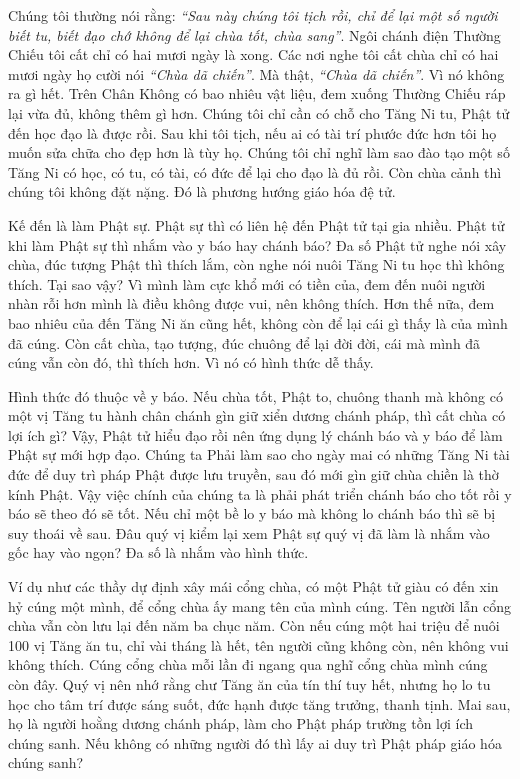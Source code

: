 \documentclass[
  12pt,
  oneside]{book}
\begin{document}
Chúng tôi thường nói rằng: \emph{``Sau này chúng tôi tịch rồi, chỉ để lại một số người biết tu, biết đạo chớ không để lại chùa tốt, chùa sang''}. Ngôi chánh điện Thường Chiếu tôi cất chỉ có hai mươi ngày là xong. Các nơi nghe tôi cất chùa chỉ có hai mươi ngày họ cười nói \emph{``Chùa dã chiến''}. Mà thật, \emph{``Chùa dã chiến''}. Vì nó không ra gì hết. Trên Chân Không có bao nhiêu vật liệu, đem xuống Thường Chiếu ráp lại vừa đủ, không thêm gì hơn. Chúng tôi chỉ cần có chỗ cho Tăng Ni tu, Phật tử đến học đạo là được rồi. Sau khi tôi tịch, nếu ai có tài trí phước đức hơn tôi họ muốn sửa chữa cho đẹp hơn là tùy họ. Chúng tôi chỉ nghĩ làm sao đào tạo một số Tăng Ni có học, có tu, có tài, có đức để lại cho đạo là đủ rồi. Còn chùa cảnh thì chúng tôi không đặt nặng. Đó là phương hướng giáo hóa đệ tử.

Kế đến là làm Phật sự. Phật sự thì có liên hệ đến Phật tử tại gia nhiều. Phật tử khi làm Phật sự thì nhắm vào y báo hay chánh báo? Đa số Phật tử nghe nói xây chùa, đúc tượng Phật thì thích lắm, còn nghe nói nuôi Tăng Ni tu học thì không thích. Tại sao vậy? Vì mình làm cực khổ mới có tiền của, đem đến nuôi người nhàn rỗi hơn mình là điều không được vui, nên không thích. Hơn thế nữa, đem bao nhiêu của đến Tăng Ni ăn cũng hết, không còn để lại cái gì thấy là của mình đã cúng. Còn cất chùa, tạo tượng, đúc chuông để lại đời đời, cái mà mình đã cúng vẫn còn đó, thì thích hơn. Vì nó có hình thức dễ thấy.

Hình thức đó thuộc về y báo. Nếu chùa tốt, Phật to, chuông thanh mà không có một vị Tăng tu hành chân chánh gìn giữ xiển dương chánh pháp, thì cất chùa có lợi ích gì? Vậy, Phật tử hiểu đạo rồi nên ứng dụng lý chánh báo và y báo để làm Phật sự mới hợp đạo. Chúng ta Phải làm sao cho ngày mai có những Tăng Ni tài đức để duy trì pháp Phật được lưu truyền, sau đó mới gìn giữ chùa chiền là thờ kính Phật. Vậy việc chính của chúng ta là phải phát triển chánh báo cho tốt rồi y báo sẽ theo đó sẽ tốt. Nếu chỉ một bề lo y báo mà không lo chánh báo thì sẽ bị suy thoái về sau. Đâu quý vị kiểm lại xem Phật sự quý vị đã làm là nhắm vào gốc hay vào ngọn? Đa số là nhắm vào hình thức.

Ví dụ như các thầy dự định xây mái cổng chùa, có một Phật tử giàu có đến xin hỷ cúng một mình, để cổng chùa ấy mang tên của mình cúng. Tên người lẫn cổng chùa vẫn còn lưu lại đến năm ba chục năm. Còn nếu cúng một hai triệu để nuôi 100 vị Tăng ăn tu, chỉ vài tháng là hết, tên người cũng không còn, nên không vui không thích. Cúng cổng chùa mỗi lần đi ngang qua nghĩ cổng chùa mình cúng còn đây. Quý vị nên nhớ rằng chư Tăng ăn của tín thí tuy hết, nhưng họ lo tu học cho tâm trí được sáng suốt, đức hạnh được tăng trưởng, thanh tịnh. Mai sau, họ là người hoằng dương chánh pháp, làm cho Phật pháp trường tồn lợi ích chúng sanh. Nếu không có những người đó thì lấy ai duy trì Phật pháp giáo hóa chúng sanh?
\end{document}
